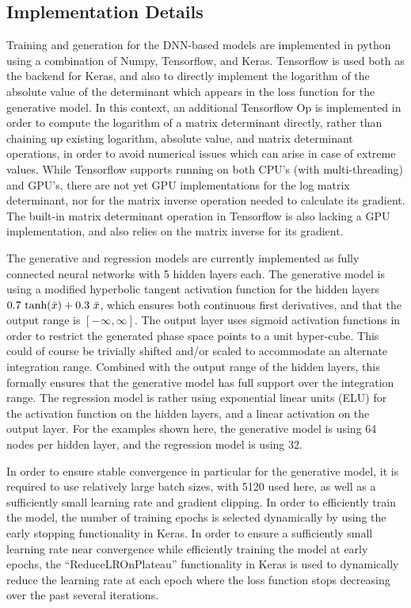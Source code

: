 \documentclass[a4paper,11pt]{article}
\begin{document}
\subsection{Implementation Details}
Training and generation for the DNN-based models are implemented in python using a combination of Numpy\cite{numpy}, Tensorflow\cite{tensorflow}, and Keras\cite{keras}.  Tensorflow is used both as the backend for Keras, and also to directly implement the logarithm of the absolute value of the determinant which appears in the loss function for the generative model.  In this context, an additional Tensorflow Op is implemented in order to compute the logarithm of a matrix determinant directly, rather than chaining up existing logarithm, absolute value, and matrix determinant operations, in order to avoid numerical issues which can arise in case of extreme values.  While Tensorflow supports running on both CPU's (with multi-threading) and GPU's, there are not yet GPU implementations for the log matrix determinant, nor for the matrix inverse operation needed to calculate its gradient.  The built-in matrix determinant operation in Tensorflow is also lacking a GPU implementation, and also relies on the matrix inverse for its gradient.

The generative and regression models are currently implemented as fully connected neural networks with 5 hidden layers each.  The generative model is using a modified hyperbolic tangent activation function for the hidden layers $0.7\ \textnormal{tanh}(\bar x) + 0.3\ \bar x$, which ensures both continuous first derivatives, and that the output range is $[-\infty,\infty]$.  The output layer uses sigmoid activation functions in order to restrict the generated phase space points to a unit hyper-cube.  This could of course be trivially shifted and/or scaled to accommodate an alternate integration range.  Combined with the output range of the hidden layers, this formally ensures that the generative model has full support over the integration range.  The regression model is rather using exponential linear units (ELU) for the activation function on the hidden layers, and a linear activation on the output layer.  For the examples shown here, the generative model is using 64 nodes per hidden layer, and the regression model is using 32.

In order to ensure stable convergence in particular for the generative model, it is required to use relatively large batch sizes, with 5120 used here, as well as a sufficiently small learning rate and gradient clipping.  In order to efficiently train the model, the number of training epochs is selected dynamically by using the early stopping functionality in Keras.  In order to ensure a sufficiently small learning rate near convergence while efficiently training the model at early epochs, the ``ReduceLROnPlateau'' functionality in Keras is used to dynamically reduce the learning rate at each epoch where the loss function stops decreasing over the past several iterations.
\end{document}

